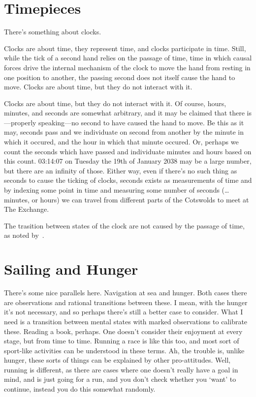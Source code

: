 \documentclass[10pt]{article}
\begin{document}
\section{Timepieces}
\label{sec:timepieces}

There's something about clocks.

Clocks are about time, they represent time, and clocks participate in time.
Still, while the tick of a second hand relies on the passage of time, time in which causal forces drive the internal mechanism of the clock to move the hand from resting in one position to another, the passing second does not itself cause the hand to move.
Clocks are about time, but they do not interact with it.

Clocks are about time, but they do not interact with it.
Of course, hours, minutes, and seconds are somewhat arbitrary, and it may be claimed that there is---properly speaking---no second to have caused the hand to move.
Be this as it may, seconds pass and we individuate on second from another by the minute in which it occured, and the hour in which that minute occured.
Or, perhaps we count the seconds which have passed and individuate minutes and hours based on this count.
03:14:07 on Tuesday the 19th of January 2038 may be a large number, but there are an infinity of those.
Either way, even if there's no such thing as seconds to cause the ticking of clocks, seconds exists as measurements of time and by indexing some point in time and measuring some number of seconds (\dots minutes, or hours) we can travel from different parts of the Cotswolds to meet at The Exchange.

The trasition between states of the clock are not caused by the passage of time, as noted by~\textcite{Smith:1988aa}.

\section{Sailing and Hunger}
\label{sec:sailing-hunger}

There's some nice parallels here.
Navigation at sea and hunger.
Both cases there are observations and rational transitions between these.
I mean, with the hunger it's not necessary, and so perhaps there's still a better case to consider.
What I need is a transition between mental states with marked observations to calibrate these.
Reading a book, perhaps.
One doesn't consider their enjoyment at every stage, but from time to time.
Running a race is like this too, and most sort of sport-like activities can be understood in these terms.
Ah, the trouble is, unlike hunger, these sorts of things can be explained by other pro-attitudes.
Well, running is different, as there are cases where one doesn't really have a goal in mind, and is just going for a run, and you don't check whether you `want' to continue, instead you do this somewhat randomly.
\end{document}
